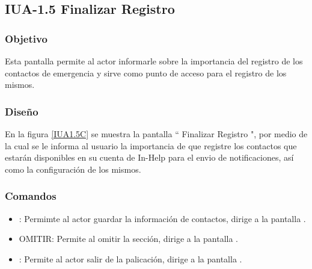 \subsection{IUA-1.5 Finalizar Registro}

\subsubsection{Objetivo}

	
 Esta pantalla permite al actor informarle sobre la importancia del registro de los contactos de emergencia y sirve como punto de acceso para el registro de los mismos.

\subsubsection{Diseño}


    En la figura \ref{IUA1.5C} se muestra la pantalla `` Finalizar Registro ", por medio de la cual se le informa al usuario la importancia de que registre los contactos que estarán disponibles en su cuenta de In-Help para el envio de notificaciones, así como la configuración de los mismos.

    

   

\subsubsection{Comandos}
    \begin{itemize}
    	\item {}: Permimte al actor guardar la información de contactos, dirige a la pantalla .
        \item OMITIR: Permite al omitir la sección, dirige a la pantalla .
        \item \btnRegresar[Regresar]: Permite al actor salir de la palicación, dirige a la pantalla .
    \end{itemize}